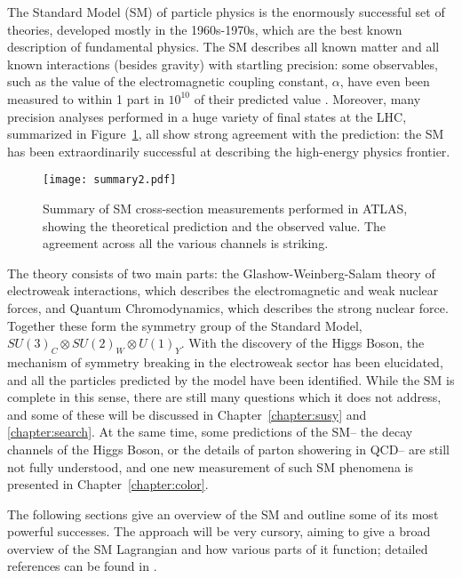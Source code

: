 \label{chapter:sm}

The Standard Model (SM) of particle physics is the enormously successful set of theories, developed mostly in the 1960s-1970s, which are the best known description of fundamental physics. The SM describes all known matter and all known interactions (besides gravity) with startling precision: some observables, such as the value of the electromagnetic coupling constant, $\alpha$, have even been measured to within 1 part in $10^{10}$ of their predicted value . Moreover, many precision analyses performed in a huge variety of final states at the LHC, summarized in Figure~\ref{fig:sm:summary}, all show strong agreement with the prediction: the SM has been extraordinarily successful at describing the high-energy physics frontier.


\begin{figure}
\centering
\texttt{[image: summary2.pdf]}
\label{fig:sm:summary}
\caption{Summary of SM cross-section measurements performed in ATLAS, showing the theoretical prediction and the observed value. The agreement across all the various channels is striking.}
\end{figure}


The theory consists of two main parts: the Glashow-Weinberg-Salam theory of electroweak interactions, which describes the electromagnetic and weak nuclear forces, and Quantum Chromodynamics, which describes the strong nuclear force. Together these form the symmetry group of the Standard Model, $SU(3)_C \otimes SU(2)_W \otimes U(1)_Y$. With the discovery of the Higgs Boson, the mechanism of symmetry breaking in the electroweak sector has been elucidated, and all the particles predicted by the model have been identified. While the SM is complete in this sense, there are still many questions which it does not address, and some of these will be discussed in Chapter~\ref{chapter:susy} and \ref{chapter:search}. At the same time, some predictions of the SM-- the decay channels of the Higgs Boson, or the details of parton showering in QCD-- are still not fully understood, and one new measurement of such SM phenomena is presented in Chapter~\ref{chapter:color}.

The following sections give an overview of the SM and outline some of its most powerful successes. The approach will be very cursory, aiming to give a broad overview of the SM Lagrangian and how various parts of it function; detailed references can be found in \cite{schwartz,2006physics11219P}. 



